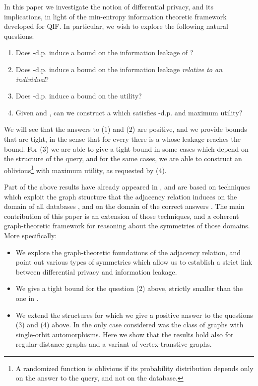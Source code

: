 \documentclass{llncs}
\begin{document}
In this paper we investigate the notion of differential privacy, and its implications, in light of the min-entropy information theoretic framework developed for QIF. In particular, we wish to explore  the following natural questions: 
\begin{enumerate}
\item Does -d.p. induce a bound on the information leakage of ? 
\item Does -d.p. induce a bound on the information leakage \emph{relative to an individual}? 
\item Does -d.p. induce a bound on the utility? 
\item Given  and , can we construct a  which satisfies -d.p. and maximum utility?
\end{enumerate}
We will see that the answers to (1) and (2) are positive, and we provide bounds that are tight, in the sense that for every  there is a  whose leakage reaches the bound. 
For (3) we are able to give a tight bound in some cases which depend on the structure of the query, and for the same cases, we are able to construct an oblivious\footnote{A randomized function   is oblivious if its probability distribution depends only on the answer to the query, and not on the database.}  with maximum utility, as requested by (4). 

Part of the above results have already appeared in \cite{Alvim:11:TechRep}, and are based on techniques which exploit the graph structure that the adjacency relation induces on the domain of all databases , and 
on the domain of the correct answers . The main contribution of this paper is an extension of those techniques, and a coherent graph-theoretic framework for reasoning about the symmetries of those domains. More specifically: 
\begin{itemize}
\item We explore the  graph-theoretic foundations of the adjacency relation, and point out various types of symmetries which allow us to establish a strict link between differential privacy and information leakage. 
\item We give a tight bound for the question (2) above, strictly smaller than the one in \cite{Alvim:11:TechRep}. 
\item We extend the structures for which we give a positive answer to the questions (3) and (4) above. In \cite{Alvim:11:TechRep}
the only case considered was the class  of graphs with single-orbit automorphisms. Here we show that the results hold also for regular-distance graphs and a variant of vertex-transtive graphs. 
\end{itemize}
\end{document}
